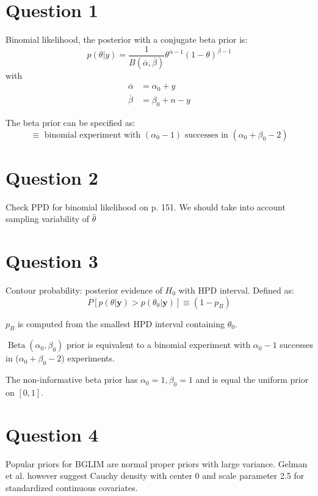 \documentclass[11pt]{article}
\author{Marc-André Chénier}
\date{\today}
\title{}
\begin{document}
\tableofcontents


\section{Question 1}
\label{sec:org134d2f8}
Binomial likelihood, the posterior with a conjugate beta prior is:
\begin{equation}
p(\theta | y)=\frac{1}{B(\overline{\alpha}, \overline{\beta})} 
\theta^{\overline{\alpha}-1}(1-\theta)^{\overline{\beta}-1}
\end{equation}
with 
\begin{equation}
\begin{aligned} \overline{\alpha} &=\alpha_{0}+y \\ 
\overline{\beta} &=\beta_{0}+n-y \end{aligned}
\end{equation}

The beta prior can be specified as:
\begin{equation}
\equiv \text { binomial experiment with }\left(\alpha_{0}-1\right) 
\text { successes in }\left(\alpha_{0}+\beta_{0}-2\right)
\end{equation}

\section{Question 2}
\label{sec:org41d5da7}
Check PPD for binomial likelihood on p. 151. We should take into
account sampling variability of \(\hat{\theta}\)

\section{Question 3}
\label{sec:orgb6d7cdb}
Contour probability: posterior evidence of \(H_{0}\) with HPD interval.
Defined as:
\begin{equation}
P\left[p(\theta | \boldsymbol{y})>p\left(\theta_{0} | 
\boldsymbol{y}\right)\right] \equiv\left(1-p_{B}\right)
\end{equation}

\(p_{B}\) is computed from the smallest HPD interval containing
\(\theta_{0}\). 

\(\operatorname{Beta}\left(\alpha_{0}, \beta_{0}\right)\) prior is
equivalent to a binomial experiment with \(\alpha_{0} - 1\) successes in
(\(\alpha_{0} + \beta_{0} - 2\)) experiments.

The non-informative beta prior has \(\alpha_{0}=1, \beta_{0}=1\) and is
equal the uniform prior on \([0, 1]\).


\section{Question 4}
\label{sec:org8e86954}
Popular priors for BGLIM are normal proper priors with large variance.
Gelman et al. however suggest Cauchy density with center 0 and scale
parameter 2.5 for standardized continuous covariates.
\end{document}
